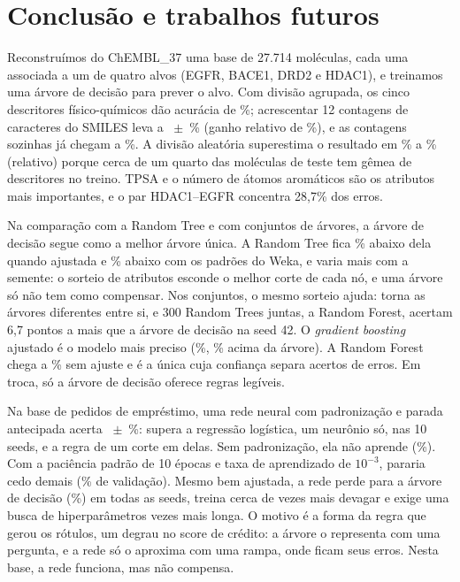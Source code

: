 \section{Conclusão e trabalhos futuros}

Reconstruímos do ChEMBL\_37 uma base de 27.714 moléculas, cada uma associada a um de quatro alvos (EGFR, BACE1, DRD2 e HDAC1), e treinamos uma árvore de decisão para prever o alvo. Com divisão agrupada, os cinco descritores físico-químicos dão acurácia de \accGrupDesc\%; acrescentar 12 contagens de caracteres do SMILES leva a \accGrupAmbos~$\pm$~\sdGrupAmbos\% (ganho relativo de \ganhoAmbos\%), e as contagens sozinhas já chegam a \accGrupSmiles\%. A divisão aleatória superestima o resultado em \gapMin\% a \gapMax\% (relativo) porque cerca de um quarto das moléculas de teste tem gêmea de descritores no treino. TPSA e o número de átomos aromáticos são os atributos mais importantes, e o par HDAC1--EGFR concentra 28,7\% dos erros.

Na comparação com a Random Tree e com conjuntos de árvores, a árvore de decisão segue como a melhor árvore única. A Random Tree fica \relRT\% abaixo dela quando ajustada e \relRTweka\% abaixo com os padrões do Weka, e varia mais com a semente: o sorteio de atributos esconde o melhor corte de cada nó, e uma árvore só não tem como compensar. Nos conjuntos, o mesmo sorteio ajuda: torna as árvores diferentes entre si, e 300 Random Trees juntas, a Random Forest, acertam 6,7 pontos a mais que a árvore de decisão na seed 42. O \emph{gradient boosting} ajustado é o modelo mais preciso (\accGBaj\%, \relGBaj\% acima da árvore). A Random Forest chega a \accRF\% sem ajuste e é a única cuja confiança separa acertos de erros. Em troca, só a árvore de decisão oferece regras legíveis.

Na base de \rnLinhas{} pedidos de empréstimo, uma rede neural com padronização e parada antecipada acerta \rnAccRede~$\pm$~\rnSdRede\%: supera a regressão logística, um neurônio só, nas 10 seeds, e a regra de um corte em \rnSeedsRedeRegra{} delas. Sem padronização, ela não aprende (\rnSemPadAcc\%). Com a paciência padrão de 10 épocas e taxa de aprendizado de $10^{-3}$, pararia cedo demais (\rnParadaAccLentaDez\% de validação). Mesmo bem ajustada, a rede perde para a árvore de decisão (\rnAccArv\%) em todas as seeds, treina cerca de \rnRazaoTreino{} vezes mais devagar e exige uma busca de hiperparâmetros \rnRazaoBusca{} vezes mais longa. O motivo é a forma da regra que gerou os rótulos, um degrau no score de crédito: a árvore o representa com uma pergunta, e a rede só o aproxima com uma rampa, onde ficam seus erros. Nesta base, a rede funciona, mas não compensa.

